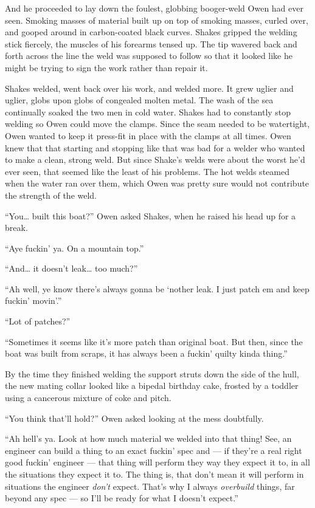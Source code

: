 \documentclass[]{scrbook}
\begin{document}
And he proceeded to lay down the foulest, globbing booger-weld Owen had
ever seen. Smoking masses of material built up on top of smoking masses,
curled over, and gooped around in carbon-coated black curves. Shakes
gripped the welding stick fiercely, the muscles of his forearms tensed
up. The tip wavered back and forth across the line the weld was supposed
to follow so that it looked like he might be trying to sign the work
rather than repair it.

Shakes welded, went back over his work, and welded more. It grew uglier
and uglier, globs upon globs of congealed molten metal. The wash of the
sea continually soaked the two men in cold water. Shakes had to
constantly stop welding so Owen could move the clamps. Since the seam
needed to be watertight, Owen wanted to keep it press-fit in place with
the clamps at all times. Owen knew that that starting and stopping like
that was bad for a welder who wanted to make a clean, strong weld. But
since Shake's welds were about the worst he'd ever seen, that seemed
like the least of his problems. The hot welds steamed when the water ran
over them, which Owen was pretty sure would not contribute the strength
of the weld.

``You\ldots{} built this boat?'' Owen asked Shakes, when he raised his
head up for a break.

``Aye fuckin' ya. On a mountain top.''

``And\ldots{} it doesn't leak\ldots{} too much?''

``Ah well, ye know there's always gonna be `nother leak. I just patch em
and keep fuckin' movin'.''

``Lot of patches?''

``Sometimes it seems like it's more patch than original boat. But then,
since the boat was built from scraps, it has always been a fuckin'
quilty kinda thing.''

By the time they finished welding the support struts down the side of
the hull, the new mating collar looked like a bipedal birthday cake,
frosted by a toddler using a cancerous mixture of coke and pitch.

``You think that'll hold?'' Owen asked looking at the mess doubtfully.

``Ah hell's ya. Look at how much material we welded into that thing!
See, an engineer can build a thing to an exact fuckin' spec and --- if
they're a real right good fuckin' engineer --- that thing will perform
they way they expect it to, in all the situations they expect it to. The
thing is, that don't mean it will perform in situations the engineer
\emph{don't} expect. That's why I always \emph{overbuild} things, far
beyond any spec --- so I'll be ready for what I doesn't expect.''
\end{document}
